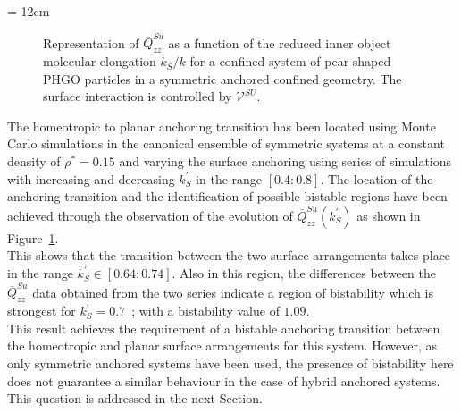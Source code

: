 \picW = 12cm
\begin{figure}
	\centering
	\caption{Representation of $\overline{Q}^{Su}_{zz}$ as a function of the reduced inner object
	molecular elongation $k_S/k$ for a confined system of pear shaped PHGO particles in a
	symmetric anchored confined geometry. The surface interaction is controlled by 
	$\mathcal{V}^{SU}$.  }
	\label{GBP_RSUP_symm_QzzWaSu}
\end{figure}

The homeotropic to planar anchoring transition has been located using Monte Carlo simulations in
the canonical ensemble of symmetric 
systems at a constant density of $\rho^{*} = 0.15$ and varying the surface anchoring using 
series of simulations with increasing and decreasing $k^\prime_S$ in the range $[0.4:0.8]$. 
The location of the anchoring transition and the identification of possible bistable regions 
have been achieved through the observation of the evolution of $\overline{Q}^{Su}_{zz}(k^\prime_S)$
as shown in Figure~\ref{GBP_RSUP_symm_QzzWaSu}.\\
%
This shows that the transition between the two surface arrangements takes place in the range 
$k^\prime_S \in [0.64:0.74]$. Also in this region, the differences between the 
$\overline{Q}^{Su}_{zz}$  data
obtained from the two series indicate a region of bistability which is strongest for 
$k^\prime_S = 0.7$~; with a bistability value of $1.09$.\\

This result achieves the requirement of a bistable anchoring transition 
between the homeotropic and planar surface arrangements for this system. 
However, as only symmetric anchored systems have been used, the presence of bistability
here does not guarantee a similar behaviour in the case of hybrid anchored systems. This
question is addressed in the next Section.





